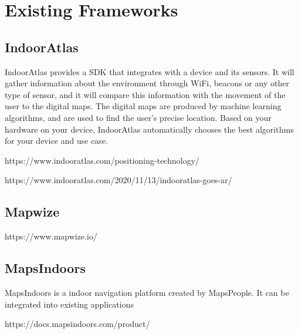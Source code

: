 \section{Existing Frameworks}



\subsection{IndoorAtlas}

IndoorAtlas provides a SDK that integrates with a device and its sensors. It will gather information about the environment through WiFi, beacons or any other type of sensor, and it will compare this information with the movement of the user to the digital maps. The digital maps are produced by machine learning algorithms, and are used to find the user's precise location. Based on your hardware on your device, IndoorAtlas automatically chooses the best algorithms for your device and use case. 

https://www.indooratlas.com/positioning-technology/

https://www.indooratlas.com/2020/11/13/indooratlas-goes-ar/


\subsection{Mapwize}


https://www.mapwize.io/



\subsection{MapsIndoors}

MapsIndoors is a indoor navigation platform created by MapsPeople. It can be integrated into existing applications



https://docs.mapsindoors.com/product/


